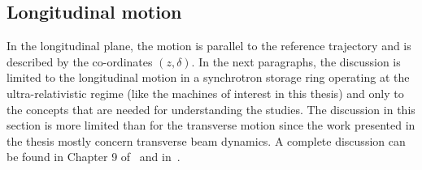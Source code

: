 


\subsection{Longitudinal motion}
In the longitudinal plane, the motion is parallel to the reference trajectory and is described by the co-ordinates $(z, \delta)$. In the next paragraphs, the discussion is limited to the longitudinal motion in a synchrotron storage ring operating at the ultra-relativistic regime (like the machines of interest in this thesis) and only to the concepts that are needed for understanding the studies. The discussion in this section is more limited than for the transverse motion since the work presented in the thesis mostly concern transverse beam dynamics. A complete discussion can be found in Chapter 9 of~\cite{Wiedemann:1083415} and in~\cite{wolski2014}.



